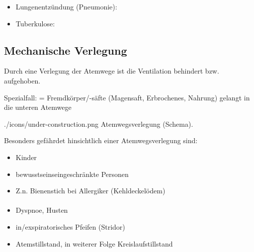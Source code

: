 % 


\begin{itemize}
  \item Lungenentzündung (Pneumonie): 
  \item Tuberkulose: 
\end{itemize}




\subsection{Mechanische Verlegung}


{
Durch eine Verlegung der Atemwege ist die Ventilation behindert bzw. aufgehoben.

Spezialfall:  =
Fremdkörper/-säfte (Magensaft, Erbrochenes, Nahrung) gelangt in die
unteren Atemwege
}
{}
{./icons/under-construction.png}
{Atemwegsverlegung (Schema). }
{}



Besonders gefährdet hinsichtlich einer Atemwegsverlegung
sind:

\begin{itemize}
  \item Kinder
  \item bewusstseinseingeschränkte Personen
  \item Z.n. Bienenstich bei Allergiker (Kehldeckelödem)
\end{itemize}

\paragraph{\TxSymptome}

\begin{itemize}
  \item Dyspnoe, Husten
  \item in/exspiratorisches Pfeifen (Stridor)
  \item Atemstillstand, in weiterer Folge Kreislaufstillstand
\end{itemize}

